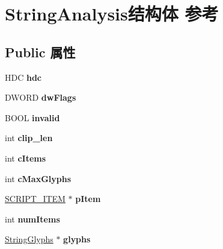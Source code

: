 \hypertarget{struct_string_analysis}{}\section{String\+Analysis结构体 参考}
\label{struct_string_analysis}
\subsection*{Public 属性}
\begin{DoxyCompactItemize}
\item 
\mbox{\label{struct_string_analysis_a6ce072b286e047872f84170c17f31fe9}} 
H\+DC {\bfseries hdc}
\item 
\mbox{\label{struct_string_analysis_a37efe4a8642b23e018ceac2e01dd99b3}} 
D\+W\+O\+RD {\bfseries dw\+Flags}
\item 
\mbox{\label{struct_string_analysis_a2c488f803f87306698876a3894a98377}} 
B\+O\+OL {\bfseries invalid}
\item 
\mbox{\label{struct_string_analysis_a04161c6d693f9dbc7dc2b2b063362685}} 
int {\bfseries clip\+\_\+len}
\item 
\mbox{\label{struct_string_analysis_a2b8bae2e3b60995c2699f3e0936b7ecc}} 
int {\bfseries c\+Items}
\item 
\mbox{\label{struct_string_analysis_a78bc0e0f29b03cee2d27e79776f1f313}} 
int {\bfseries c\+Max\+Glyphs}
\item 
\mbox{\label{struct_string_analysis_ae3dc37f0eeaef02c5595e240e73e1f39}} 
\hyperlink{structtag___s_c_r_i_p_t___i_t_e_m}{S\+C\+R\+I\+P\+T\+\_\+\+I\+T\+EM} $\ast$ {\bfseries p\+Item}
\item 
\mbox{\label{struct_string_analysis_ac68210099fad0a305364a9cd81b289cf}} 
int {\bfseries num\+Items}
\item 
\mbox{\label{struct_string_analysis_a4040f482fd62d2eaf3f62fabcc3843e4}} 
\hyperlink{struct_string_glyphs}{String\+Glyphs} $\ast$ {\bfseries glyphs}

\end{DoxyCompactItemize}
